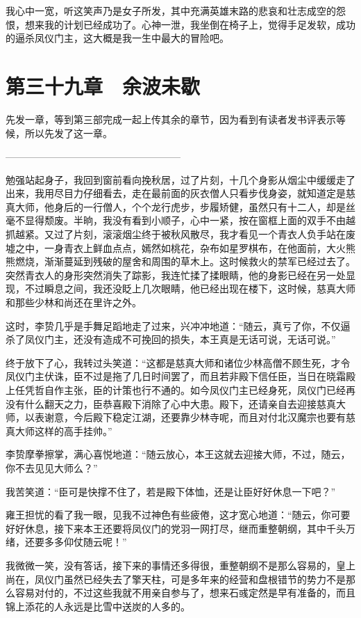 我心中一宽，听这笑声乃是女子所发，其中充满英雄末路的悲哀和壮志成空的怨恨，想来我的计划已经成功了。心神一泄，我坐倒在椅子上，觉得手足发软，成功的逼杀凤仪门主，这大概是我一生中最大的冒险吧。

\chapter{第三十九章　余波未歇}

先发一章，等到第三部完成一起上传其余的章节，因为看到有读者发书评表示等候，所以先发了这一章。

——————————————————

勉强站起身子，我回到窗前看向挽秋居，过了片刻，十几个身影从烟尘中缓缓走了出来，我用尽目力仔细看去，走在最前面的灰衣僧人只看步伐身姿，就知道定是慈真大师，他身后的一行僧人，个个龙行虎步，步履矫健，虽然只有十二人，却是丝毫不显得颓废。半晌，我没有看到小顺子，心中一紧，按在窗框上面的双手不由越抓越紧。又过了片刻，滚滚烟尘终于被秋风散尽，我才看见一个青衣人负手站在废墟之中，一身青衣上鲜血点点，嫣然如桃花，杂布如星罗棋布，在他面前，大火熊熊燃烧，渐渐蔓延到残破的屋舍和周围的草木上。这时候救火的禁军已经过去了。突然青衣人的身形突然消失了踪影，我连忙揉了揉眼睛，他的身影已经在另一处显现，不过瞬息之间，我还没眨上几次眼睛，他已经出现在楼下，这时候，慈真大师和那些少林和尚还在里许之外。

这时，李贽几乎是手舞足蹈地走了过来，兴冲冲地道：“随云，真亏了你，不仅逼杀了凤仪门主，还没有造成不可挽回的损失，本王真是无话可说，无话可说。”

终于放下了心，我转过头笑道：“这都是慈真大师和诸位少林高僧不顾生死，才令凤仪门主伏诛，臣不过是拖了几日时间罢了，而且若非殿下信任臣，当日在晓霜殿上任凭哲自作主张，臣的计策也行不通的。如今凤仪门主已经身死，凤仪门已经再没有什么翻天之力，臣恭喜殿下消除了心中大患。殿下，还请亲自去迎接慈真大师，以表谢意，今后殿下稳定江湖，还要靠少林寺呢，而且对付北汉魔宗也要有慈真大师这样的高手挂帅。”

李贽摩拳擦掌，满心喜悦地道：“随云放心，本王这就去迎接大师，不过，随云，你不去见见大师么？”

我苦笑道：“臣可是快撑不住了，若是殿下体恤，还是让臣好好休息一下吧？”

雍王担忧的看了我一眼，见我不过神色有些疲倦，这才宽心地道：“随云，你可要好好休息，接下来本王还要将凤仪门的党羽一网打尽，继而重整朝纲，其中千头万绪，还要多多仰仗随云呢！”

我微微一笑，没有答话，接下来的事情还多得很，重整朝纲不是那么容易的，皇上尚在，凤仪门虽然已经失去了擎天柱，可是多年来的经营和盘根错节的势力不是那么容易对付的，不过这些我就不用亲自参与了，想来石彧定然是早有准备的，而且锦上添花的人永远是比雪中送炭的人多的。

